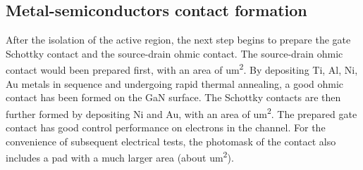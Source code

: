 \subsection{Metal-semiconductors contact formation}

After  the isolation  of the  active region, the next step begins to prepare the gate Schottky contact  and the source-drain  ohmic contact. The source-drain ohmic contact would been prepared first, with an area of  \unit{um^2}. By depositing Ti, Al, Ni, Au metals in sequence and undergoing rapid thermal  annealing, a good ohmic contact has been formed on the GaN  surface. The Schottky contacts are then further formed by depositing Ni and Au, with an area of  \unit{um^2}. The prepared gate contact has good control performance on electrons in the channel. For the convenience of subsequent electrical tests, the photomask  of the contact also includes a pad with a much larger area (about  \unit{um^2}).

